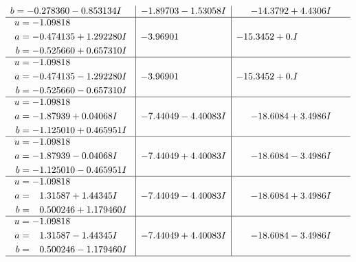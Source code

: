 \documentclass[1p]{elsarticle_modified}
\theoremstyle{definition}
\begin{document}
$$\begin{array}{c|c|c}
\begin{aligned}
b &= -0.278360 - 0.853134 I\end{aligned}
 & -1.89703 - 1.53058 I & -14.3792 + 4.4306 I \\ \hline\begin{aligned}
u &= -1.09818\phantom{ +0.000000I} \\
a &= -0.474135 + 1.292280 I \\
b &= -0.525660 + 0.657310 I\end{aligned}
 & -3.96901\phantom{ +0.000000I} & -15.3452 + 0. I\phantom{ +0.000000I} \\ \hline\begin{aligned}
u &= -1.09818\phantom{ +0.000000I} \\
a &= -0.474135 - 1.292280 I \\
b &= -0.525660 - 0.657310 I\end{aligned}
 & -3.96901\phantom{ +0.000000I} & -15.3452 + 0. I\phantom{ +0.000000I} \\ \hline\begin{aligned}
u &= -1.09818\phantom{ +0.000000I} \\
a &= -1.87939 + 0.04068 I \\
b &= -1.125010 + 0.465951 I\end{aligned}
 & -7.44049 - 4.40083 I & -18.6084 + 3.4986 I \\ \hline\begin{aligned}
u &= -1.09818\phantom{ +0.000000I} \\
a &= -1.87939 - 0.04068 I \\
b &= -1.125010 - 0.465951 I\end{aligned}
 & -7.44049 + 4.40083 I & -18.6084 - 3.4986 I \\ \hline\begin{aligned}
u &= -1.09818\phantom{ +0.000000I} \\
a &= \phantom{-}1.31587 + 1.44345 I \\
b &= \phantom{-}0.500246 + 1.179460 I\end{aligned}
 & -7.44049 - 4.40083 I & -18.6084 + 3.4986 I \\ \hline\begin{aligned}
u &= -1.09818\phantom{ +0.000000I} \\
a &= \phantom{-}1.31587 - 1.44345 I \\
b &= \phantom{-}0.500246 - 1.179460 I\end{aligned}
 & -7.44049 + 4.40083 I & -18.6084 - 3.4986 I\\
 \hline 
 \end{array}$$\newpage$$\begin{array}{c|c|c}  

\end{array}$$
\end{document}

